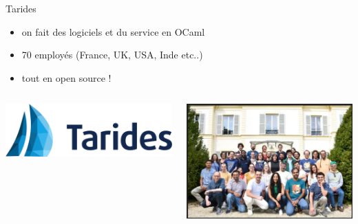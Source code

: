 
\begin{frame}{Tarides}

    \begin{itemize}[label=$-$]
        \item on fait des logiciels et du service en OCaml
        \item 70 employés (France, UK, USA, Inde etc..)
        \item tout en open source !  
    \end{itemize}
    
\begin{columns} 
    \centering
    \includegraphics[width=\textwidth]{slides/images/logo-TARIDES.png}

    \centering
    \includegraphics[width=\textwidth]{slides/images/tarides_team.png}
\end{columns}

\end{frame}

